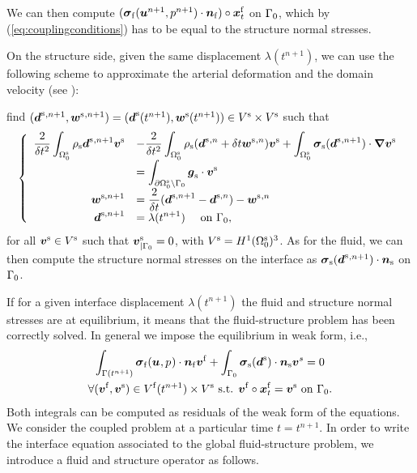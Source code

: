 We can then compute $  (\Fstress[{n+1}] \cdot {\uu n}_\mf) \circ \ALE t $ on $ \GamFSi$,
which by (\ref{eq:couplingconditions}) has to be equal to the structure normal stresses.


On the structure side, given the same displacement $\lambda(t^{n+1})$, we can use the
following scheme to approximate the arterial deformation and the domain
velocity (see \cite{FerMou04:NewtonFS}):

find $(\ds{}^{,n+1},\ws{}^{,n+1})=(\ds(t^{n+1}),\ws(t^{n+1})) \in V^\ms\times
V^\ms$ such that
\begin{equation} \label{eq:variationalstructure}
\left\{
\begin{array}{rl}
    \dis  \frac{2}{\delta t^2} \int_{\DomSi} \rho_\ms \ds{}^{, n+1} \V^\ms
    &\dis-  \frac{2}{\delta t^2} \int_{\DomSi} \rho_\ms (\ds{}^{, n} + \delta t \ws{}^{, n})\V^\ms
    +  \int_{\DomSi} \Sstress(\ds{}^{, n+1})\cdot \Grad \V^\ms    \\
    &\dis = \int_{\partial\DomSi\setminus\GamFSi} \uu g_\ms \cdot \V^\ms\\
    \dis \uu w^{\ms,n+1} &\dis=  \frac{2}{\delta t}(\uu d^{\ms,n+1} - \uu d^{\ms,n}) - \ws{}^{,n}\\
    \dis\uu d^{\ms,n+1} &\dis =  \lambda(t^{n+1}) \quad\text{ on } \GamFSi,
    \end{array}
\right.
\end{equation}
for all $\V^\ms \in V^\ms$ such that $\V^\ms_{|\GamFSi} = 0$,
with $V^\ms = H^1(\DomSi)^3 $. As for the fluid, we can then compute the structure
normal stresses on the interface  as $\Sstress(\Ds{}^{, n+1}) \cdot {\uu n}_\ms$  on $\GamFSi$.

If for a given interface displacement $\lambda(t^{n+1})$ the fluid and structure normal stresses are
at equilibrium,
it means that the fluid-structure problem has
been correctly solved.
In general we impose the equilibrium in weak form, i.e.,
\begin{multline*}
  \int_{\GamFS{n+1}} \Fstress \cdot \uu n_{\mf}\V^\mf + \int_{\GamFSi}
  \Sstress(\Ds) \cdot \uu n_{\ms} \V^s = 0 \\
  \forall (\V^\mf,
  \V^\ms) \in V^\mf(t^{n+1}) \times V^\ms \text{ s.t. } \V^\mf\circ\ALE t =
  \V^\ms \text{ on } \GamFSi.
\end{multline*}
Both integrals can be computed as residuals of
the weak form of the equations.
We consider the coupled problem at a particular time  $t=t^{n+1}$.
In order to write the interface equation associated to the global
fluid-structure problem, we introduce a fluid and structure operator
as follows.

